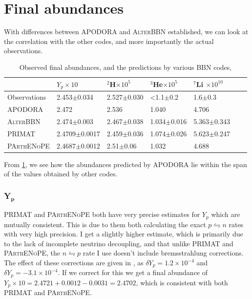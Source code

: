 \section{Final abundances}
\label{sec:finalabun}
With differences between APODORA and \textsc{AlterBBN} established, we can look at the correlation with the other codes, and more importantly the actual observations. 
\begin{table}[ht]
    \begin{tabular}{l|llllll}
               & $Y_p \times 10$ & \hspace{-0.34em}$^{2}$H$ \times 10^{5}$ & \hspace{-0.34em}$^{3}$He$ \times 10^{5}$ & \hspace{-0.34em}$^{7}$Li $ \times 10^{10}$\\ \hline
    Observations  & 2.453$\pm$0.034    & 2.527$\pm$0.030 & <1.1$\pm$0.2 & 1.6$\pm$0.3    \\ \hline
    APODORA  & 2.472            & 2.536 & 1.040 & 4.706     \\ \hline
    \textsc{AlterBBN} & 2.474$\pm$0.003 & 2.467$\pm$0.038 & 1.034$\pm$0.016 & 5.363$\pm$0.343    \\ \hline
    PRIMAT & 2.4709$\pm$0.0017   & 2.459$\pm$0.036 & 1.074$\pm$0.026 & 5.623$\pm$0.247   \\ \hline
    \textsc{PArthENoPE}& 2.4687$\pm$0.0012     & 2.51$\pm$0.06 & 1.032  & 4.688      
    \end{tabular}
    \caption{Observed final abundances\cite{Yp_Aver_2021}\cite{deuterium_Cooke_2018}\cite{Allobsabun}, and the predictions by various BBN codes\cite{AlterBBN}\cite{PRIMAT}\cite{PArthENoPE},}
    \label{tab:Obsabun}
\end{table}
From \cref{tab:Obsabun}, we see how the abundances predicted by APODORA lie within the span of the values obtained by other codes. 

\subsubsection{Y$_\textbf{p}$}
PRIMAT and \textsc{PArthENoPE} both have very precise estimates for $Y_p$ which are mutually consistent. This is due to them both calculating the exact $p\leftrightharpoons n$ rates with very high precision. I get a slightly higher estimate, which is primarily due to the lack of incomplete neutrino decoupling, and that unlike PRIMAT and \textsc{PArthENoPE}, the $n \leftrightharpoons p$ rate I use doesn't include bremsstrahlung corrections\cite{Serpico_2004}. The effect of these corrections are given in \textcite[table V]{PRIMAT}, as $\delta Y_p = 1.2\times10^{-4}$ and $\delta Y_p = -3.1\times10^{-4}$. If we correct for this we get a final abundance of $Y_p\times 10 = 2.4721+0.0012-0.0031=2.4702$, which is consistent with both PRIMAT and \textsc{PArthENoPE}.

